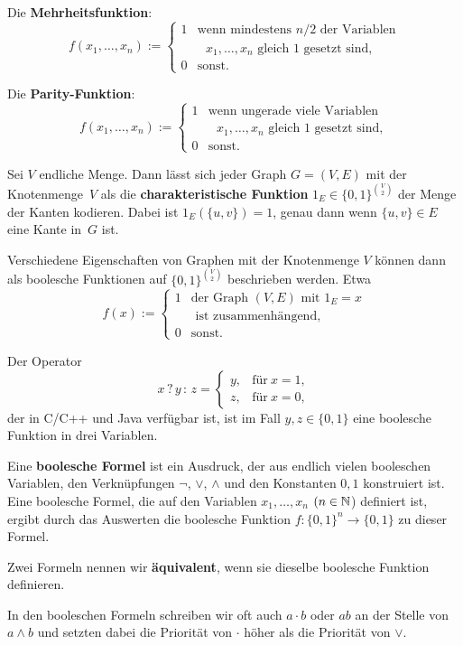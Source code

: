 \begin{bsp}\
	\begin{enuma} 
		\item Die \textbf{Mehrheitsfunktion}:
		\[
		f (x_1,\ldots,x_n) := \begin{cases} 
			1 & \text{wenn mindestens $n/2$ der Variablen}
			\\ & 		\text{ $x_1,\ldots,x_n$ gleich $1$ gesetzt sind}, 
			\\ 0 & \text{sonst}. 
		\end{cases} 
		\]
		\item Die \textbf{Parity-Funktion}: 
		\[
		f (x_1,\ldots,x_n) := \begin{cases} 
			1 & \text{wenn ungerade viele Variablen}
			\\ & 		\text{ $x_1,\ldots,x_n$ gleich $1$ gesetzt sind}, 
			\\ 0 & \text{sonst}. 
		\end{cases} 
		\]
		\item Sei $V$ endliche Menge. Dann lässt sich jeder Graph $G = (V,E)$ mit der Knotenmenge~$V$ als die \textbf{charakteristische Funktion} $1_E \in \{0,1\}^{\binom{V}{2}}$ der Menge der Kanten kodieren. Dabei ist $1_E(\{u,v\}) = 1$, genau dann wenn $\{u,v\} \in E$ eine Kante in~$G$ ist.
		
		Verschiedene Eigenschaften von Graphen mit der Knotenmenge $V$ können dann als boolesche Funktionen auf $\{0,1\}^{\binom{V}{2}}$ beschrieben werden. Etwa 
		\[
			f(x) := \begin{cases} 1 & \text{der Graph $(V,E)$ mit $1_E=x$} 
				\\ & \text{ ist zusammenhängend}, 
				\\0  & \text{sonst}.
				\end{cases} 
		\]
		\condclearpage
		\item Der Operator
		\[
			  x \, ?\, y \, :\, z = \begin{cases}
			  			y, & \text{für} \ x =1,
			  			\\ z, & \text{für} \  x=0,
			  	\end{cases} 
		\]
		der in C/C++ und Java verfügbar ist, ist im Fall $y,z \in \{0,1\}$ eine boolesche Funktion in drei Variablen. 
	\end{enuma}
\end{bsp}

\begin{defn}
	Eine \textbf{boolesche Formel} ist ein Ausdruck, der aus endlich vielen booleschen Variablen, den Verknüpfungen $\neg$, $\vee$, $\wedge$ und den Konstanten $0,1$ konstruiert ist. Eine boolesche Formel, die auf den Variablen  $x_1,\ldots,x_n$ $(n \in \mathbb{N}$) definiert ist, ergibt durch das Auswerten die boolesche Funktion $f : \{0,1\}^n \to \{0,1\}$ zu dieser Formel. 
	
	Zwei Formeln nennen wir \textbf{äquivalent}, wenn sie dieselbe boolesche Funktion definieren. 
	
	In den booleschen Formeln schreiben wir oft auch $a \cdot b$ oder $a b$ an der Stelle von $a \wedge b$ und setzten dabei die Priorität von $\cdot$ höher als die Priorität von $\vee$.	
\end{defn} 


